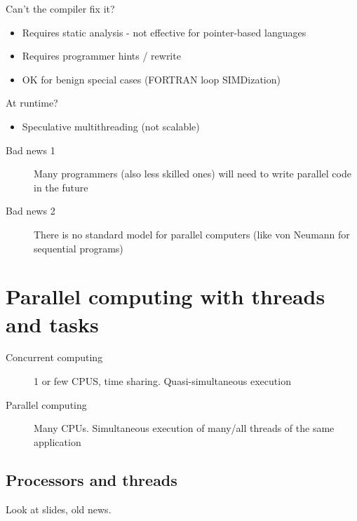 \documentclass[a4paper]{article}
\begin{document}
Can't the compiler fix it?
\begin{itemize}
  \item Requires static analysis - not effective for pointer-based languages
  \item Requires programmer hints / rewrite
  \item OK for benign special cases (FORTRAN loop SIMDization)
\end{itemize}

At runtime?
\begin{itemize}
  \item Speculative multithreading (not scalable)
\end{itemize}

\begin{description}
  \item[Bad news 1] Many programmers (also less skilled ones) will need to write
    parallel code in the future
  \item[Bad news 2] There is no standard model for parallel computers (like von
    Neumann for sequential programs)
\end{description}

\section{Parallel computing with threads and tasks}

\begin{description}
  \item[Concurrent computing] 1 or few CPUS, time sharing. Quasi-simultaneous
    execution
  \item[Parallel computing]  Many CPUs. Simultaneous execution of many/all
    threads of the same application
\end{description}

\subsection{Processors and threads}
Look at slides, old news.
\end{document}
